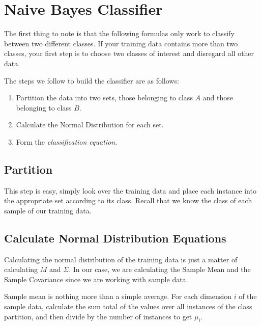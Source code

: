 \documentclass{article}
\begin{document}

\section{Naive Bayes Classifier}
\label{sec:nbayes}

The first thing to note is that the following formulas only work to classify between two different classes.  If your training data contains more than two classes, your first step is to choose two classes of interest and disregard all other data.

The steps we follow to build the classifier are as follows:
\begin{enumerate}
\item Partition the data into two sets, those belonging to class $A$ and those belonging to class $B$.
\item Calculate the Normal Distribution for each set.
\item Form the \emph{classification equation}.
\end{enumerate}

\subsection{Partition}

This step is easy, simply look over the training data and place each instance into the appropriate set according to its class.  Recall that we know the class of each sample of our training data.

\subsection{Calculate Normal Distribution Equations}

Calculating the normal distribution of the training data is just a matter of calculating $M$ and $\Sigma$.  In our case, we are calculating the Sample Mean and the Sample Covariance\footnotemark {} since we are working with sample data.

Sample mean is nothing more than a simple average.  For each dimension $i$ of the sample data, calculate the sum total of the values over all instances of the class partition, and then divide by the number of instances to get $\mu_i$.
\end{document}
